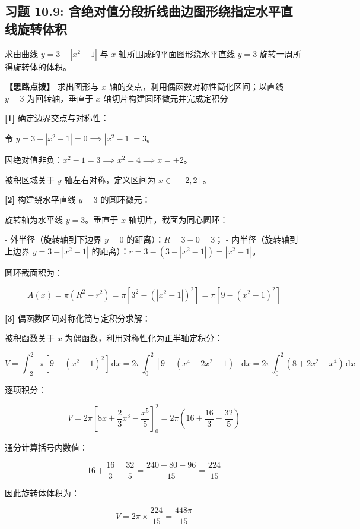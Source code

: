 \documentclass[11pt,a4paper,UTF8]{ctexart}
\begin{document}
\subsection{习题 10.9: 含绝对值分段折线曲边图形绕指定水平直线旋转体积}

求由曲线 $y = 3 - |x^2-1|$ 与 $x$ 轴所围成的平面图形绕水平直线 $y = 3$ 旋转一周所得旋转体的体积。

\textbf{\color{DeepPurple}【思路点拨】} 求出图形与 $x$ 轴的交点，利用偶函数对称性简化区间；以直线 $y = 3$ 为回转轴，垂直于 $x$ 轴切片构建圆环微元并完成定积分


\begin{solbox}[分步推导与答题规范]
\textbf{[1]} 确定边界交点与对称性：

令 $y = 3 - |x^2-1| = 0 \implies |x^2-1| = 3$。

因绝对值非负：$x^2 - 1 = 3 \implies x^2 = 4 \implies x = \pm 2$。

被积区域关于 $y$ 轴左右对称，定义区间为 $x \in [-2, 2]$。

\textbf{[2]} 构建绕水平直线 $y = 3$ 的圆环微元：

旋转轴为水平线 $y = 3$。垂直于 $x$ 轴切片，截面为同心圆环：

- 外半径（旋转轴到下边界 $y = 0$ 的距离）：$R = 3 - 0 = 3$；
- 内半径（旋转轴到上边界 $y = 3 - |x^2-1|$ 的距离）：$r = 3 - (3 - |x^2-1|) = |x^2-1|$。

圆环截面积为：


\begin{equation*}
A(x) = \pi(R^2 - r^2) = \pi [3^2 - (|x^2-1|)^2] = \pi [9 - (x^2-1)^2]
\end{equation*}


\textbf{[3]} 偶函数区间对称化简与定积分求解：

被积函数关于 $x$ 为偶函数，利用对称性化为正半轴定积分：


\begin{equation*}
V = \int_{-2}^2 \pi [9 - (x^2-1)^2]\,\mathrm{d}x = 2\pi \int_0^2 [9 - (x^4 - 2x^2 + 1)]\,\mathrm{d}x = 2\pi \int_0^2 (8 + 2x^2 - x^4)\,\mathrm{d}x
\end{equation*}


逐项积分：


\begin{equation*}
V = 2\pi \left[8x + \frac{2}{3}x^3 - \frac{x^5}{5}\right]_0^2 = 2\pi \left(16 + \frac{16}{3} - \frac{32}{5}\right)
\end{equation*}


通分计算括号内数值：


\begin{equation*}
16 + \frac{16}{3} - \frac{32}{5} = \frac{240 + 80 - 96}{15} = \frac{224}{15}
\end{equation*}


因此旋转体体积为：


\begin{equation*}
V = 2\pi \times \frac{224}{15} = \frac{448\pi}{15}
\end{equation*}

\end{solbox}
\end{document}
